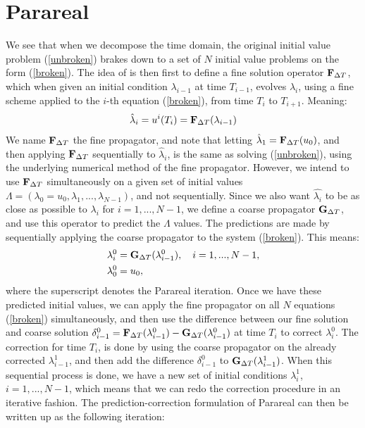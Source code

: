 \section{Parareal}\label{Parareal_sec}
We see that when we decompose the time domain, the original initial value problem (\ref{unbroken}) brakes down to a set of $N$ initial value problems on the form (\ref{broken}). The idea of \cite{baffico2002parallel} is then first to define a fine solution operator $\bold F_{\Delta T}$, which when given an initial condition $\lambda_{i-1}$ at time $T_{i-1}$, evolves $\lambda_i$, using a fine scheme applied to the $i$-th equation (\ref{broken}), from time $T_i$ to $T_{i+1}$. Meaning:
\begin{align*}
\hat \lambda_{i}= u^i(T_{i})=\bold F_{\Delta T}(\lambda_{i-1})
\end{align*} 
We name $\bold F_{\Delta T}$ the fine propagator, and note that letting $\hat \lambda_{1}=\bold F_{\Delta T}(u_0)$, and then applying $\bold F_{\Delta T}$ sequentially to $\hat \lambda_{i}$, is the same as solving (\ref{unbroken}), using the underlying numerical method of the fine propagator. However, we intend to use $\bold F_{\Delta T}$ simultaneously on a given set of initial values $\Lambda=(\lambda_0=u_0,\lambda_1,...,\lambda_{N-1})$, and not sequentially. Since we also want $\hat{\lambda_i}$ to be as close as possible to $\lambda_i$ for $i=1,...,N-1$, we define a coarse propagator $\bold G_{\Delta T}$, and use this operator to predict the $\Lambda$ values. The predictions are made by sequentially applying the coarse propagator to the system (\ref{broken}). This means:
\begin{align}
\lambda_i^0 &= \bold G_{\Delta T}(\lambda_{i-1}^0),\quad i=1,...,N-1, \\
\lambda_0^0&=u_0,
\end{align} 
where the superscript denotes the Parareal iteration. Once we have these predicted initial values, we can apply the fine propagator on all $N$ equations (\ref{broken}) simultaneously, and then use the difference between our fine solution and coarse solution $\delta_{i-1}^0= \bold F_ {\Delta T}( \lambda_{i-1}^0)-\bold G_ {\Delta T}( \lambda_{i-1}^0)$ at time $T_{i}$ to correct $\lambda_i^0$. The correction for time $T_i$, is done by using the coarse propagator on the already corrected $\lambda_{i-1}^1$, and then add the difference $\delta_{i-1}^0$ to $\bold G_ {\Delta T}(\lambda_{i-1}^1)$. When this sequential process is done, we have a new set of initial conditions $\lambda_i^1$, $i=1,...,N-1$, which means that we can redo the correction procedure in an iterative fashion. The prediction-correction formulation of Parareal can then be written up as the following iteration:
